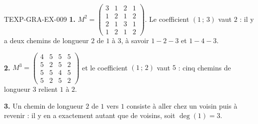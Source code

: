 \begin{corrige}{TEXP-GRA-EX-009}
\textbf{1.} $M^2=\begin{pmatrix}3&1&2&1\\1&2&1&2\\2&1&3&1\\1&2&1&2\end{pmatrix}$.
Le coefficient $(1\,;\,3)$ vaut $2$ : il y a deux chemins de longueur $2$ de
$1$ à $3$, à savoir $1-2-3$ et $1-4-3$.

\textbf{2.} $M^3=\begin{pmatrix}4&5&5&5\\5&2&5&2\\5&5&4&5\\5&2&5&2\end{pmatrix}$
et le coefficient $(1\,;\,2)$ vaut $5$ : cinq chemins de longueur $3$ relient
$1$ à $2$.

\textbf{3.} Un chemin de longueur $2$ de $1$ vers $1$ consiste à aller chez un
voisin puis à revenir : il y en a exactement autant que de voisins, soit
$\deg(1)=3$.
\end{corrige}
